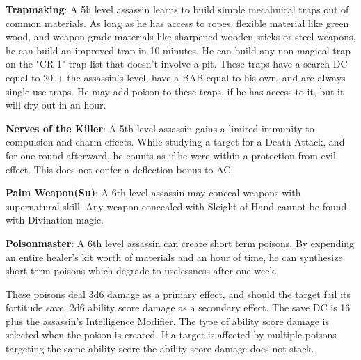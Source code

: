 \textbf{Trapmaking}: A 5h level assassin learns to build simple mecahnical traps out of common materials. As long as he has access to ropes, flexible material like green wood, and weapon-grade materials like sharpened wooden sticks or steel weapons, he can build an improved trap in 10 minutes. He can build any non-magical trap on the "CR 1" trap list that doesn't involve a pit. These traps have a search DC equal to 20 + the assassin's level, have a BAB equal to his own, and are always single-use traps. He may add poison to these traps, if he has access to it, but it will dry out in an hour.

\textbf{Nerves of the Killer}:  A 5th level assassin gains a limited immunity to compulsion and charm effects. While studying a target for a Death Attack, and for one round afterward, he counts as if he were within a protection from evil effect. This does not confer a deflection bonus to AC.

\textbf{Palm Weapon(Su)}: A 6th level assassin may conceal weapons with supernatural skill. Any weapon concealed with Sleight of Hand cannot be found with Divination magic.

\textbf{Poisonmaster}: A 6th level assassin can create short term poisons. By expending an entire healer's kit worth of materials and an hour of time, he can synthesize short term poisons which degrade to uselessness after one week.

These poisons deal 3d6 damage as a primary effect, and should the target fail its fortitude save, 2d6 ability score damage as a secondary effect. The save DC is 16 plus the assassin's Intelligence Modifier. The type of ability score damage is selected when the poison is created. If a target is affected by multiple poisons targeting the same ability score the ability score damage does not stack.